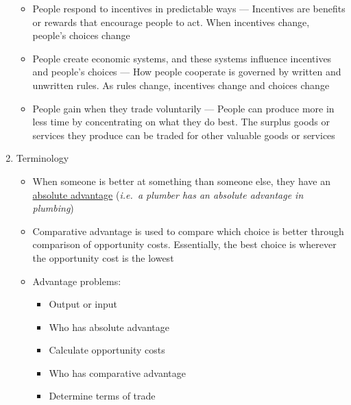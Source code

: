 \documentclass[12pt]{article}
\begin{document}
\begin{enumerate}
\begin{itemize}
      \item People respond to incentives in predictable ways — Incentives are benefits or rewards that encourage people to act. When incentives change, people's choices change

      \item People create economic systems, and these systems influence incentives and people's choices — How people cooperate is governed by written and unwritten rules. As rules change, incentives change and choices change

      \item People gain when they trade voluntarily — People can produce more in less time by concentrating on what they do best. The surplus goods or services they produce can be traded for other valuable goods or services

    \end{itemize}

  \item Terminology

    \begin{itemize}

      \item When someone is better at something than someone else, they have an \underline{absolute advantage} (\textit{i.e.\ a plumber has an absolute advantage in plumbing})

      \item Comparative advantage is used to compare which choice is better through comparison of opportunity costs. Essentially, the best choice is wherever the opportunity cost is the lowest

      \item Advantage problems:

        \begin{itemize}

          \item Output or input

          \item Who has absolute advantage

          \item Calculate opportunity costs

          \item Who has comparative advantage

          \item Determine terms of trade

        \end{itemize}

    \end{itemize}

\end{enumerate}
\end{document}
